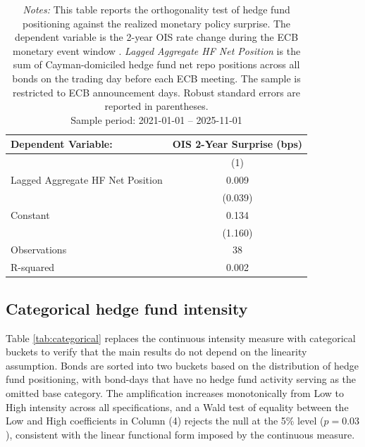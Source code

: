 \documentclass[english, 11pt, oneside]{article}
\begin{document}
\begin{table}[h!]
\centering
\caption{\textbf{Pre-existing Positioning and Monetary Policy Surprise}}
\footnotesize
\setlength{\tabcolsep}{8pt}
\renewcommand{\arraystretch}{1.1}
\begin{tabular}{l c}
\toprule
\textbf{Dependent Variable:} & \textbf{OIS 2-Year Surprise (bps)} \\
\midrule
 & (1) \\
\midrule
Lagged Aggregate HF Net Position & 0.009 \\
 & (0.039) \\
\addlinespace
Constant & 0.134 \\
 & (1.160) \\
\midrule
Observations & 38 \\
R-squared & 0.002 \\
\bottomrule
\end{tabular}
\label{tab:orthogonality}
\caption*{\textit{Notes:} This table reports the orthogonality test of hedge fund positioning against the realized monetary policy surprise. The dependent variable is the 2-year OIS rate change during the ECB monetary event window \citep{altavilla2019}. \textit{Lagged Aggregate HF Net Position} is the sum of Cayman-domiciled hedge fund net repo positions across all bonds on the trading day before each ECB meeting. The sample is restricted to ECB announcement days. Robust standard errors are reported in parentheses. \\ Sample period: 2021-01-01 -- 2025-11-01}
\end{table}



\clearpage
\subsection{Categorical hedge fund intensity}
\label{subsec:categorical}
Table \ref{tab:categorical} replaces the continuous intensity measure with categorical buckets to verify that the main results do not depend on the linearity assumption. Bonds are sorted into two buckets based on the distribution of hedge fund positioning, with bond-days that have no hedge fund activity serving as the omitted base category. The amplification increases monotonically from Low to High intensity across all specifications, and a Wald test of equality between the Low and High coefficients in Column (4) rejects the null at the 5\% level ($p = 0.03$), consistent with the linear functional form imposed by the continuous measure. \\
\end{document}
